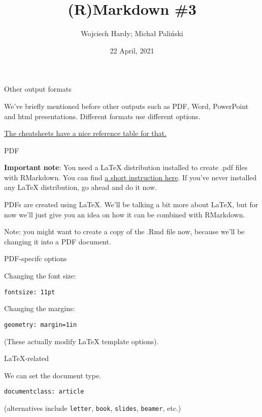 \documentclass[
  11pt,
  ignorenonframetext,
]{article}
\title{(R)Markdown \#3}
\author{Wojciech Hardy; Michał Paliński}
\date{22 April, 2021}
\begin{document}
\frame{\titlepage}

\begin{frame}{Other output formats}
\protect\hypertarget{other-output-formats}{}

We've briefly mentioned before other outputs such as PDF, Word,
PowerPoint and html presentations. Different formats use different
options.

\href{https://www.rstudio.com/wp-content/uploads/2015/03/rmarkdown-reference.pdf}{The
cheatsheets have a nice reference table for that.}

\end{frame}

\begin{frame}[fragile]

\begin{block}{PDF}

\textbf{Important note}: You need a LaTeX distribution installed to
create .pdf files with RMarkdown. You can find
\href{https://bookdown.org/yihui/rmarkdown-cookbook/install-latex.html}{a
short instruction here}. If you've never installed any LaTeX
distribution, go ahead and do it now.

PDFs are created using LaTeX. We'll be talking a bit more about LaTeX,
but for now we'll just give you an idea on how it can be combined with
RMarkdown.

Note: you might want to create a copy of the .Rmd file now, because
we'll be changing it into a PDF document.

\begin{block}{PDF-specifc options}

Changing the font size:

\texttt{fontsize:\ 11pt}

Changing the margins:

\texttt{geometry:\ margin=1in}

(These actually modify LaTeX template options).

\end{block}

\end{block}

\end{frame}

\begin{frame}[fragile]

\begin{block}{LaTeX-related}

We can set the document type.

\texttt{documentclass:\ article}

(alternatives include \texttt{letter}, \texttt{book}, \texttt{slides},
\texttt{beamer}, etc.)

\end{block}

\end{frame}
\end{document}
